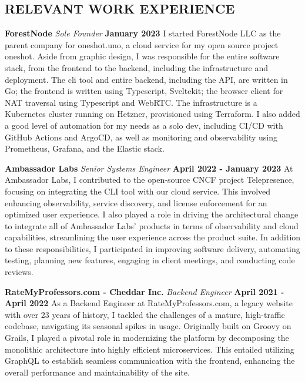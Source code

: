 \documentclass[margin]{./res}
\begin{document}
\begin{resume}
\section{RELEVANT WORK EXPERIENCE}
{\bf ForestNode}\newline
{\it Sole Founder}\newline
{\bf January 2023}
I started ForestNode LLC as the parent company for oneshot.uno, a cloud service for my open source project oneshot.
Aside from graphic design, I was responsible for the entire software stack, from the frontend to the backend, including the infrastructure and deployment.
The cli tool and entire backend, including the API, are written in Go; the frontend is written using Typescript, Sveltekit; the browser client for NAT traversal using Typescript and WebRTC.
The infrastructure is a Kubernetes cluster running on Hetzner, provisioned using Terraform.
I also added a good level of automation for my needs as a solo dev, including CI/CD with GitHub Actions and ArgoCD, as well as monitoring and observability using Prometheus, Grafana, and the Elastic stack.

{\bf Ambassador Labs }\newline
{\it Senior Systems Engineer}\newline
{\bf April 2022 - January 2023}
At Ambassador Labs, I contributed to the open-source CNCF project Telepresence, focusing on integrating the CLI tool with our cloud service. This involved enhancing observability, service discovery, and license enforcement for an optimized user experience. I also played a role in driving the architectural change to integrate all of Ambassador Labs' products in terms of observability and cloud capabilities, streamlining the user experience across the product suite. In addition to these responsibilities, I participated in improving software delivery, automating testing, planning new features, engaging in client meetings, and conducting code reviews.

{\bf RateMyProfessors.com - Cheddar Inc. }\newline
{\it Backend Engineer }\newline
{\bf April 2021 - April 2022}\newline
As a Backend Engineer at RateMyProfessors.com, a legacy website with over 23 years of history, I tackled the challenges of a mature, high-traffic codebase, navigating its seasonal spikes in usage. Originally built on Groovy on Grails, I played a pivotal role in modernizing the platform by decomposing the monolithic architecture into highly efficient microservices. This entailed utilizing GraphQL to establish seamless communication with the frontend, enhancing the overall performance and maintainability of the site.


\end{resume}
\end{document}
